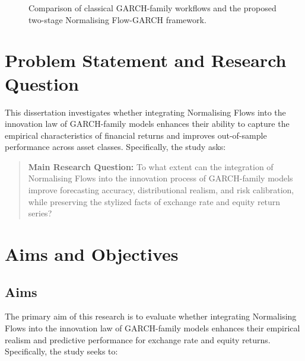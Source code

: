 \documentclass[oneside,12pt]{CUEDthesisPSnPDF}
\begin{document}
\begin{figure}[tbp]
{%
}

\caption{Comparison of classical GARCH-family workflows and the proposed two-stage Normalising Flow-GARCH framework. }
\label{fig:overview_flow}
\end{figure}


\section{Problem Statement and Research Question}
\noindent
This dissertation investigates whether integrating Normalising Flows into the innovation law of GARCH-family models enhances their ability to capture the empirical characteristics of financial returns and improves out-of-sample performance across asset classes. Specifically, the study asks:

\begin{quote}
\textbf{Main Research Question:} 
To what extent can the integration of Normalising Flows into the innovation process of GARCH-family models improve forecasting accuracy, distributional realism, and risk calibration, while preserving the stylized facts of exchange rate and equity return series?
\end{quote}


\section{Aims and Objectives}

\subsection{Aims}
\noindent 
The primary aim of this research is to evaluate whether integrating Normalising Flows into the innovation law of GARCH-family models enhances their empirical realism and predictive performance for exchange rate and equity returns. Specifically, the study seeks to:
\end{document}
